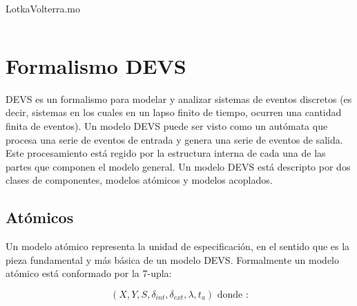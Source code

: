 	\begin{listing}[H]    
		\caption{LotkaVolterra.mo}
		\inputminted[linenos]{modelica}{src/lotka_volterra_qss.mo}
		\label{lst:LotkaVolterra.mo}
	\end{listing} 


\section{Formalismo DEVS}
	DEVS\cite{Zeigler} es un formalismo para modelar y analizar sistemas de eventos discretos (es decir, sistemas en los cuales en un lapso finito de tiempo, 
	ocurren una cantidad finita de eventos).
	Un modelo DEVS puede ser visto como un autómata que procesa una serie de eventos de entrada y genera una serie de eventos de salida. 
	Este procesamiento está regido por la estructura interna de cada una de las partes que componen el modelo general.
	Un modelo DEVS está descripto por dos clases de componentes, modelos atómicos y modelos acoplados.

	\subsection{Atómicos}
	Un modelo atómico representa la unidad  de especificación, en el sentido que es la pieza fundamental y más básica de un modelo DEVS. 
	Formalmente un modelo atómico está conformado por la 7-upla:

	\begin{equation} 
	(X, Y, S, \delta_{int} , \delta_{ext}, \lambda, t_{a}) \mbox{ donde :}
	\end{equation}

